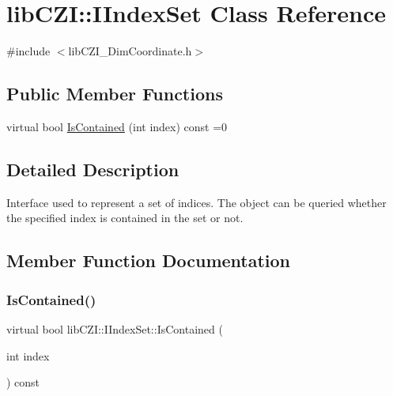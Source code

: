 \hypertarget{classlib_c_z_i_1_1_i_index_set}{}\section{lib\+C\+ZI\+:\+:I\+Index\+Set Class Reference}
\label{classlib_c_z_i_1_1_i_index_set}


{\ttfamily \#include $<$lib\+C\+Z\+I\+\_\+\+Dim\+Coordinate.\+h$>$}

\subsection*{Public Member Functions}
\begin{DoxyCompactItemize}
\item 
virtual bool \hyperlink{classlib_c_z_i_1_1_i_index_set_aca780c448b752cff46fcabb8f25e3c9a}{Is\+Contained} (int index) const =0
\end{DoxyCompactItemize}


\subsection{Detailed Description}
Interface used to represent a set of indices. The object can be queried whether the specified index is contained in the set or not. 

\subsection{Member Function Documentation}
\mbox{\label{classlib_c_z_i_1_1_i_index_set_aca780c448b752cff46fcabb8f25e3c9a}} 
\subsubsection{\texorpdfstring{Is\+Contained()}{IsContained()}}
{\footnotesize\ttfamily virtual bool lib\+C\+Z\+I\+::\+I\+Index\+Set\+::\+Is\+Contained (\begin{DoxyParamCaption}\item[{int}]{index }\end{DoxyParamCaption}) const\hspace{0.3cm}{\ttfamily [pure virtual]}}

